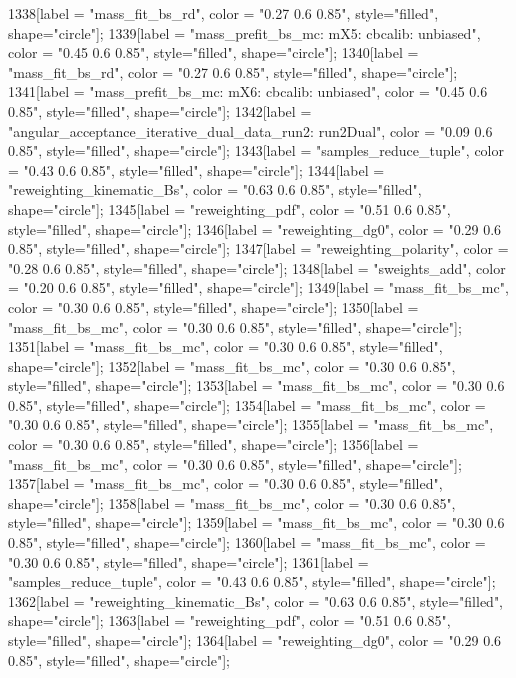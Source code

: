 {	1338[label = "mass_fit_bs_rd", color = "0.27 0.6 0.85", style="filled", shape="circle"];
	1339[label = "mass_prefit_bs_mc\nmassbin: mX5\nmassmodel: cbcalib\ntrigger: unbiased", color = "0.45 0.6 0.85", style="filled", shape="circle"];
	1340[label = "mass_fit_bs_rd", color = "0.27 0.6 0.85", style="filled", shape="circle"];
	1341[label = "mass_prefit_bs_mc\nmassbin: mX6\nmassmodel: cbcalib\ntrigger: unbiased", color = "0.45 0.6 0.85", style="filled", shape="circle"];
	1342[label = "angular_acceptance_iterative_dual_data_run2\nangacc: run2Dual", color = "0.09 0.6 0.85", style="filled", shape="circle"];
	1343[label = "samples_reduce_tuple", color = "0.43 0.6 0.85", style="filled", shape="circle"];
	1344[label = "reweighting_kinematic_Bs", color = "0.63 0.6 0.85", style="filled", shape="circle"];
	1345[label = "reweighting_pdf", color = "0.51 0.6 0.85", style="filled", shape="circle"];
	1346[label = "reweighting_dg0", color = "0.29 0.6 0.85", style="filled", shape="circle"];
	1347[label = "reweighting_polarity", color = "0.28 0.6 0.85", style="filled", shape="circle"];
	1348[label = "sweights_add", color = "0.20 0.6 0.85", style="filled", shape="circle"];
	1349[label = "mass_fit_bs_mc", color = "0.30 0.6 0.85", style="filled", shape="circle"];
	1350[label = "mass_fit_bs_mc", color = "0.30 0.6 0.85", style="filled", shape="circle"];
	1351[label = "mass_fit_bs_mc", color = "0.30 0.6 0.85", style="filled", shape="circle"];
	1352[label = "mass_fit_bs_mc", color = "0.30 0.6 0.85", style="filled", shape="circle"];
	1353[label = "mass_fit_bs_mc", color = "0.30 0.6 0.85", style="filled", shape="circle"];
	1354[label = "mass_fit_bs_mc", color = "0.30 0.6 0.85", style="filled", shape="circle"];
	1355[label = "mass_fit_bs_mc", color = "0.30 0.6 0.85", style="filled", shape="circle"];
	1356[label = "mass_fit_bs_mc", color = "0.30 0.6 0.85", style="filled", shape="circle"];
	1357[label = "mass_fit_bs_mc", color = "0.30 0.6 0.85", style="filled", shape="circle"];
	1358[label = "mass_fit_bs_mc", color = "0.30 0.6 0.85", style="filled", shape="circle"];
	1359[label = "mass_fit_bs_mc", color = "0.30 0.6 0.85", style="filled", shape="circle"];
	1360[label = "mass_fit_bs_mc", color = "0.30 0.6 0.85", style="filled", shape="circle"];
	1361[label = "samples_reduce_tuple", color = "0.43 0.6 0.85", style="filled", shape="circle"];
	1362[label = "reweighting_kinematic_Bs", color = "0.63 0.6 0.85", style="filled", shape="circle"];
	1363[label = "reweighting_pdf", color = "0.51 0.6 0.85", style="filled", shape="circle"];
	1364[label = "reweighting_dg0", color = "0.29 0.6 0.85", style="filled", shape="circle"];
}
